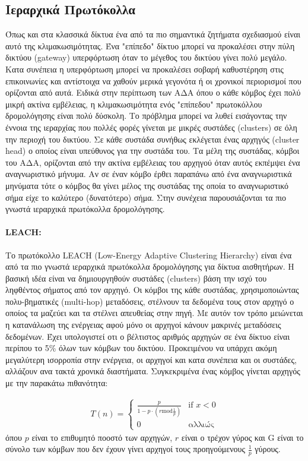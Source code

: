 \subsection{Ιεραρχικά Πρωτόκολλα}
Όπως και στα κλασσικά δίκτυα ένα από τα πιο σημαντικά ζητήματα σχεδιασμού είναι αυτό της κλιμακωσιμότητας. Ένα "επίπεδο" δίκτυο μπορεί να προκαλέσει στην πύλη
δικτύου (gateway) υπερφόρτωση όταν το μέγεθος του δικτύου γίνει πολύ μεγάλο. Κατα συνέπεια η υπερφόρτωση μπορεί να προκαλέσει σοβαρή καθυστέρηση στις επικοινωνίες
και αντίστοιχα να χαθούν μερικά γεγονότα ή οι χρονικοί περιορισμοί που ορίζονται από αυτά. Ειδικά στην περίπτωση των ΑΔΑ όπου ο κάθε κόμβος έχει πολύ μικρή ακτίνα
εμβέλειας, η κλιμακωσιμότητα ενός "επίπεδου" πρωτοκόλλου δρομολόγησης είναι πολύ δύσκολη. Το πρόβλημα μπορεί να λυθεί εισάγοντας την έννοια της ιεραρχίας που πολλές
φορές γίνεται με μικρές συστάδες (clusters) σε όλη την περιοχή του δικτύου. Σε κάθε συστάδα συνήθως εκλέγεται ένας αρχηγός (cluster head) ο οποίος είναι υπεύθυνος για
την συστάδα του. Τα μέλη της συστάδας, κόμβοι του ΑΔΑ, ορίζονται από την ακτίνα εμβέλειας του αρχηγού όταν αυτός εκπέμψει ένα αναγνωριστικό μήνυμα. Αν σε έναν κόμβο
έρθει παραπάνω από ένα αναγνωριστικά μηνύματα τότε ο κόμβος θα γίνει μέλος της συστάδας της οποία το αναγνωριστικό σήμα είχε το καλύτερο (δυνατότερο) σήμα. Στην
συνέχεια παρουσιάζονται τα πιο γνωστά ιεραρχικά πρωτόκολλα δρομολόγησης.

\paragraph{LEACH:} Το πρωτόκολλο LEACH (Low-Energy Adaptive Clustering Hierarchy) \cite{leach_protocol} είναι ένα από τα πιο γνωστά ιεραρχικά πρωτόκολλα δρομολόγησης
για δίκτυα αισθητήρων. Η βασική ιδέα είναι να δημιουργηθούν συστάδες (clusters) βάση την ισχύ του ληφθέντος σήματος από τον αρχηγό. Οι κόμβοι της κάθε συστάδας,
χρησιμοποιώντας πολυ-βηματικές (multi-hop) μεταδόσεις, στέλνουν τα δεδομένα τους στον αρχηγό ο οποίος τα μαζεύει και τα στέλνει απευθείας στην πηγή. Με αυτόν τον
τρόπο μειώνεται η κατανάλωση της ενέργειας αφού μόνο οι αρχηγοί κάνουν μακρινές μεταδόσεις δεδομένων. Έχει υπολογιστεί οτι ο βέλτιστος αριθμός αρχηγών σε ένα δίκτυο
είναι περίπου το 5\% όλων των κόμβων του δικτύου. Προκειμένου να υπάρχει ακόμη μεγαλύτερη ισορροπία στην ενέργεια, οι αρχηγοί και κατα συνέπεια και οι συστάδες,
αλλάζουν ανα τακτά χρονικά διαστήματα. Συγκεκριμένα ένας κόμβος γίνεται αρχηγός με την παρακάτω πιθανότητα:

\begin{align*}
T(n) = \left\{
\begin{array}{cc}
 \frac{p}{1-p\cdot(r \text{mod}\frac{1}{p})} & \text{if } x<0 \\
  0 & \text{αλλιώς}
\end{array} \right.
\end{align*}
όπου $p$ είναι το επιθυμητό ποοστό των αρχηγών, $r$ είναι ο τρέχον γύρος και G είναι το σύνολο των κόμβων που δεν έχουν γίνει αρχηγοί τους προηγούμενους $\frac{1}{p}$
γύρους.

